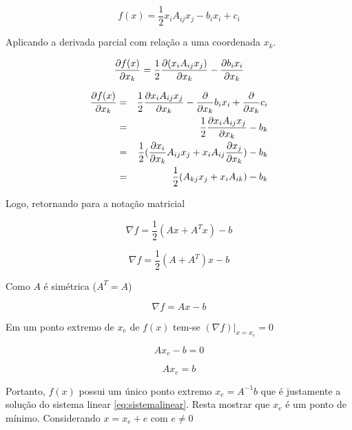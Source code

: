 \begin{equation} \label{eq:quadratica_ind}
    f(x) = \frac{1}{2} x_i A_{ij} x_j - b_i x_i + c_i
\end{equation}


Aplicando a derivada parcial com relação a uma coordenada $x_k$.

\begin{equation}
    \dxk[f(x)] = \frac{1}{2}  \dxk[ (x_i A_{ij} x_j) ]- \dxk[b_i x_i]
\end{equation}

\begin{eqnarray}
     \dxk[f(x)] & = & \frac{1}{2} \dxk[ x_i A_{ij} x_j ]- \dxk{b_i x_i}+ \dxk{c_i} \\
                & = & \frac{1}{2} \dxk[ x_i A_{ij} x_j ]- b_k \\  
                & = & \frac{1}{2} (\dxk[ x_i ]A_{ij} x_j  + x_i A_{ij} \dxk[x_j]) - b_k \\  
                & = & \frac{1}{2}(A_{kj} x_j  + x_i A_{ik})  - b_k
\end{eqnarray}


Logo, retornando para a notação matricial


\begin{equation}
    \nabla f = \frac{1}{2} (Ax + A^T x) - b
\end{equation}


\begin{equation}
    \nabla f = \frac{1}{2} (A + A^T) x - b
\end{equation}

Como $A$ é simétrica ($A^T = A$)

\begin{equation} \label{eq:gradf}
    \nabla f = A x - b
\end{equation}

Em um ponto extremo de  $ x_e$ de $f(x)$ tem-se $(\nabla f)|_{x=x_e} = 0 $

\begin{equation}
    Ax_e - b = 0 
\end{equation}

\begin{equation}
    Ax_e = b
\end{equation}

Portanto, $f(x)$ possui um único ponto extremo $x_e = A^{-1}b$ que é justamente a solução do sistema linear \ref{eq:sistemalinear}. Resta mostrar que $x_e$ é um ponto de mínimo.
Considerando $x = x_e + e$ com $e \neq 0 $


